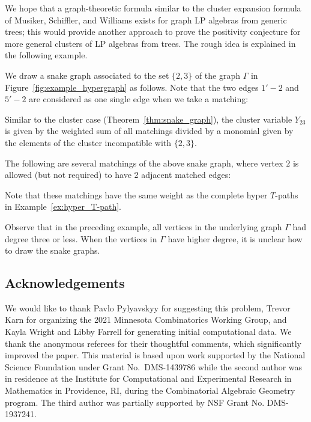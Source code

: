 \documentclass[pdftex]{sigma}
\numberwithin{equation}{section}
\begin{document}
We hope that a graph-theoretic formula similar to the cluster expansion formula of Musiker, Schiffler, and Williams exists for graph LP algebras from generic trees; this would provide another approach to prove the positivity conjecture for more general clusters of LP algebras from trees. The rough idea is explained in the following example.

\begin{Example} We draw a snake graph associated to the set $\{2,3\}$ of the graph $\Gamma$ in Figure~\ref{fig:example_hypergraph} as follows.
Note that the two edges $1'-2$ and $5'-2$ are considered as one single edge when we take a matching:
\begin{center}
\end{center}


Similar to the cluster case (Theorem~\ref{thm:snake_graph}), the cluster variable $Y_{23}$ is given by the weighted sum of all matchings divided by a monomial given by the elements of the cluster incompatible with $\{2,3\}$.

The following are several matchings of the above snake graph, where vertex $2$ is allowed (but not required) to have 2 adjacent matched edges:
\begin{center}
 \quad{}

 \quad{}

\end{center}
Note that these matchings have the same weight as the complete hyper $T$-paths in Example~\ref{ex:hyper_T-path}.
\end{Example}

Observe that in the preceding example, all vertices in the underlying graph $\Gamma$ had degree three or less. When the vertices in $\Gamma$ have higher degree, it is unclear how to draw the snake graphs.

\subsection*{Acknowledgements}

We would like to thank Pavlo Pylyavskyy for suggesting this problem, Trevor Karn for organizing the 2021 Minnesota Combinatorics Working Group, and Kayla Wright and Libby Farrell for generating initial computational data. We thank the anonymous referees for their thoughtful comments, which significantly improved the paper.
This material is based upon work supported by the National Science Foundation under Grant No.~DMS-1439786 while the second author was in residence at the Institute for Computational and Experimental Research in Mathematics in Providence, RI, during the Combinatorial Algebraic Geometry program. The third author was partially supported by NSF Grant No. DMS-1937241.
\end{document}
